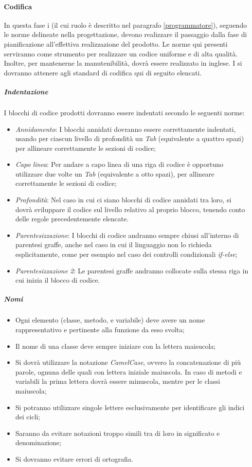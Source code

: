 	\paragraph{Codifica}
	In questa fase i \progrs{} (il cui ruolo è descritto nel paragrafo \ref{programmatore}), seguendo le norme delineate nella progettazione, devono realizzare il passaggio dalla fase di pianificazione all'effettiva realizzazione del prodotto.
	Le norme qui presenti serviranno come strumento per realizzare un codice uniforme e di alta qualità. Inoltre, per mantenerne la manutenibilità, dovrà essere realizzato in inglese.
	I \progrs{} si dovranno attenere agli standard di codifica qui di seguito elencati.
	\subparagraph{Indentazione}
	I blocchi di codice prodotti dovranno essere indentati secondo le seguenti norme:
	\begin{itemize}
		\item \emph{Annidamento}: I blocchi annidati dovranno essere correttamente indentati, usando per ciascun livello di profondità un \emph{Tab} (equivalente a quattro spazi) per allineare correttamente le sezioni di codice;
		\item \emph{Capo linea}: Per andare a capo linea di una riga di codice è opportuno utilizzare due volte un \emph{Tab} (equivalente a otto spazi), per allineare correttamente le sezioni di codice;
		\item \emph{Profondità}: Nel caso in cui ci siano blocchi di codice annidati tra loro, si dovrà sviluppare il codice sul livello relativo al proprio blocco, tenendo conto delle regole precedentemente elencate.
		\item \emph{Parentesizzazione}: I blocchi di codice andranno sempre chiusi all'interno di parentesi graffe, anche nel caso in cui il linguaggio non lo richieda esplicitamente, come per esempio nel caso dei controlli condizionali \emph{if-else};
		\item \emph{Parentesizzazione 2}: Le parentesi graffe andranno collocate sulla stessa riga in cui inizia il blocco di codice.
	\end{itemize}
	\subparagraph{Nomi}
	\begin{itemize}
		\item Ogni elemento (classe, metodo, e variabile) deve avere un nome rappresentativo e pertinente alla funzione da esso svolta;
		\item Il nome di una classe deve sempre iniziare con la lettera maisucola;
		\item Si dovrà utilizzare la notazione \emph{CamelCase}, ovvero la concatenazione di più parole, ognuna delle quali con lettera iniziale maiuscola. In caso di metodi e variabili la prima lettera dovrà essere minuscola, mentre per le classi maiuscola;
		\item Si potranno utilizzare singole lettere esclusivamente per identificare gli indici dei cicli;
		\item Saranno da evitare notazioni troppo simili tra di loro in significato e denominazione;
		\item Si dovranno evitare errori di ortografia.
	\end{itemize}
